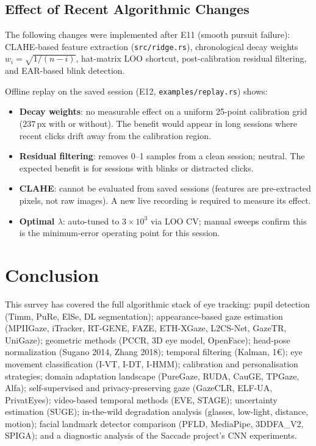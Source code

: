 \documentclass[11pt,a4paper]{article}
\begin{document}
\subsection{Effect of Recent Algorithmic Changes}

The following changes were implemented after E11 (smooth pursuit failure):
CLAHE-based feature extraction (\texttt{src/ridge.rs}),
chronological decay weights $w_i = \sqrt{1/(n-i)}$,
hat-matrix LOO shortcut,
post-calibration residual filtering,
and EAR-based blink detection.

Offline replay on the saved session (E12, \texttt{examples/replay.rs}) shows:

\begin{itemize}
  \item \textbf{Decay weights}: no measurable effect on a uniform 25-point calibration grid ($237$\,px with or without). The benefit would appear in long sessions where recent clicks drift away from the calibration region.
  \item \textbf{Residual filtering}: removes 0--1 samples from a clean session; neutral. The expected benefit is for sessions with blinks or distracted clicks.
  \item \textbf{CLAHE}: cannot be evaluated from saved sessions (features are pre-extracted pixels, not raw images). A new live recording is required to measure its effect.
  \item \textbf{Optimal $\lambda$}: auto-tuned to $3\times10^3$ via LOO CV; manual sweeps confirm this is the minimum-error operating point for this session.
\end{itemize}

\section{Conclusion}
\label{sec:conclusion}

This survey has covered the full algorithmic stack of eye tracking:
pupil detection (Timm, PuRe, ElSe, DL segmentation);
appearance-based gaze estimation (MPIIGaze, iTracker, RT-GENE, FAZE, ETH-XGaze, L2CS-Net, GazeTR, UniGaze);
geometric methods (PCCR, 3D eye model, OpenFace);
head-pose normalization (Sugano 2014, Zhang 2018);
temporal filtering (Kalman, 1\euro);
eye movement classification (I-VT, I-DT, I-HMM);
calibration and personalisation strategies;
domain adaptation landscape (PureGaze, RUDA, CauGE, TPGaze, Alfa);
self-supervised and privacy-preserving gaze (GazeCLR, ELF-UA, PrivatEyes);
video-based temporal methods (EVE, STAGE);
uncertainty estimation (SUGE);
in-the-wild degradation analysis (glasses, low-light, distance, motion);
facial landmark detector comparison (PFLD, MediaPipe, 3DDFA\_V2, SPIGA);
and a diagnostic analysis of the Saccade project's CNN experiments.
\end{document}
